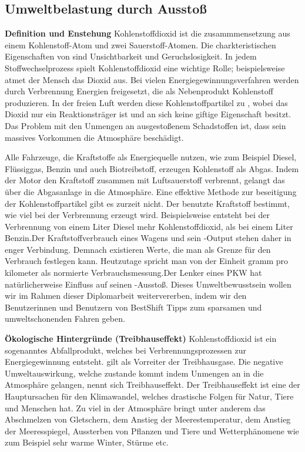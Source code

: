 \subsection{Umweltbelastung durch  Ausstoß}

\textbf{Definition und Enstehung\nextline}
Kohlenstoffdioxid ist die zusammmensetzung aus einem Kohlenstoff-Atom und zwei Sauerstoff-Atomen. Die charkteristischen Eigenschaften von  sind Unsichtbarkeit und Geruchslosigkeit. In jedem Stoffwechselprozess spielt Kohlenstoffdioxid eine wichtige Rolle; beispielsweise atmet der Mensch das Dioxid aus. Bei vielen Energiegewinnungsverfahren werden durch Verbrennung Energien freigesetzt, die als Nebenprodukt Kohlenstoff produzieren. In der freien Luft werden diese Kohlenstoffpartikel zu , wobei das Dioxid nur ein Reaktionsträger ist und an sich keine giftige Eigenschaft besitzt. Das Problem mit den Unmengen an ausgestoßenem Schadstoffen ist, dass sein massives Vorkommen die Atmosphäre beschädigt.

Alle Fahrzeuge, die Kraftstoffe als Energiequelle nutzen, wie zum Beispiel Diesel, Flüssiggas, Benzin und auch Biotreibstoff, erzeugen Kohlenstoff als Abgas. Indem der Motor den Kraftstoff zusammen mit Luftsauerstoff verbrennt, gelangt das  über die Abgasanlage in die Atmosphäre. Eine effektive Methode zur beseitigung der Kohlenstoffpartikel gibt es zurzeit nicht. Der benutzte Kraftstoff bestimmt, wie viel  bei der Verbrennung erzeugt wird. Beispielsweise entsteht bei der Verbrennung von einem Liter Diesel mehr Kohlenstoffdioxid, als bei einem Liter Benzin.Der Kraftstoffverbrauch eines Wagens und sein -Output stehen daher in enger Verbindung. Demnach existieren Werte, die man als Grenze für den Verbrauch festlegen kann. Heutzutage spricht man von der Einheit gramm pro kilometer als normierte Verbrauchsmessung.Der Lenker eines PKW hat natürlicherweise Einfluss auf seinen -Ausstoß. Dieses Umweltbewusstsein wollen wir im Rahmen dieser Diplomarbeit weitervererben, indem wir den Benutzerinnen und Benutzern von BestShift Tipps zum sparsamen und umweltschonenden Fahren geben.

\textbf{Ökologische Hintergründe (Treibhauseffekt)\nextline}
Kohlenstoffdioxid ist ein sogenanntes Abfallprodukt, welches bei Verbrennungsprozessen zur Energiegewinnung entsteht. 
 gilt als Vorreiter der Treibhausgase.
Die negative Umweltauswirkung, welche zustande kommt indem Unmengen an  in die Atmosphäre gelangen, 
nennt sich Treibhauseffekt. 
Der Treibhauseffekt ist eine der Hauptursachen für den Klimawandel, welches drastische Folgen für Natur, Tiere und Menschen hat. 
Zu viel  in der Atmosphäre bringt unter anderem das Abschmelzen von Gletschern, 
dem Anstieg der Meerestemperatur, dem Anstieg der Meeresspiegel, 
Aussterben von Pflanzen und Tiere und Wetterphänomene wie zum Beispiel sehr warme Winter, Stürme etc.

